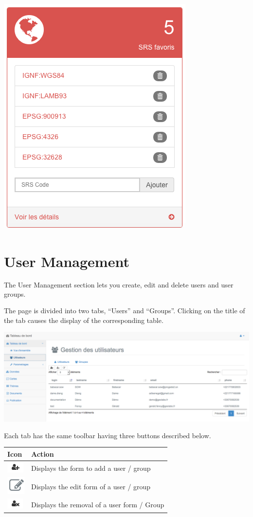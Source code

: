 \documentclass[letterpaper,10pt,english]{sphinxmanual}
\begin{document}
\includegraphics[width=0.330\linewidth]{dashboard-srs-block.png}


\section{User Management}
\label{dashboard/usersmanagement:gestion-des-utilisateurs}\label{dashboard/usersmanagement::doc}\label{dashboard/usersmanagement:dashboard-usersmanagement}
The User Management section lets you create, edit and delete users and user groups.

The page is divided into two tabs, ``Users'' and ``Groups''. Clicking on the title of the tab causes the display of the corresponding table.

\includegraphics[width=1.000\linewidth]{manage-users-preview.png}

Each tab has the same toolbar having three buttons described below.

\begin{tabulary}{\linewidth}{|L|L|}
\hline

\textbf{Icon}
 & 
\textbf{Action}
\\
\hline
\includegraphics{add-user.png}
 & 
Displays the form to add a user / group
\\
\hline
\includegraphics{pencil.png}
 & 
Displays the edit form of a user / group
\\
\hline
\includegraphics{delete-user.png}
 & 
Displays the removal of a user form / Group
\\
\hline\end{tabulary}
\end{document}
